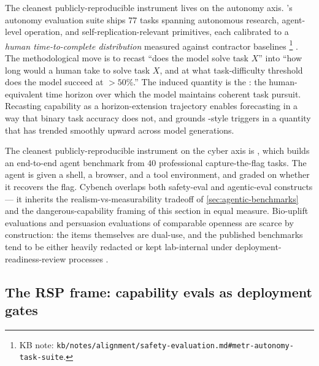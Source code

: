 The cleanest publicly-reproducible instrument lives on the
autonomy axis. 's autonomy evaluation suite ships $77$ tasks
spanning autonomous research, agent-level operation, and
self-replication-relevant primitives, each calibrated to a
\emph{human time-to-complete distribution} measured against
contractor baselines%
\footnote{KB note: \nolinkurl{kb/notes/alignment/safety-evaluation.md#metr-autonomy-task-suite}.}
\citep{metr-autonomy-2024}. The methodological move is to recast
``does the model solve task $X$'' into ``how long would a human take
to solve task $X$, and at what task-difficulty threshold does the
model succeed at $> 50\%$.'' The induced quantity is the
\emph{}: the human-equivalent time horizon over
which the model maintains coherent task pursuit. Recasting capability
as a horizon-extension trajectory enables forecasting in a way that
binary task accuracy does not, and grounds -style triggers in a
quantity that has trended smoothly upward across model generations.

The cleanest publicly-reproducible instrument on the cyber axis is
\citet{cybench2024}, which builds an end-to-end  agent benchmark
from $40$ professional capture-the-flag tasks. The agent is given a
shell, a browser, and a tool environment, and graded on whether it
recovers the flag. Cybench overlaps both safety-eval and agentic-eval
constructs --- it inherits the realism-vs-measurability tradeoff of
\cref{sec:agentic-benchmarks} and the dangerous-capability framing of
this section in equal measure. Bio-uplift evaluations and persuasion
evaluations of comparable openness are scarce by construction: the
items themselves are dual-use, and the published benchmarks tend to be
either heavily redacted  or kept lab-internal under
deployment-readiness-review processes
.

\subsection{The RSP frame: capability evals as deployment gates}
\label{sec:dangerous-capability-rsp}


